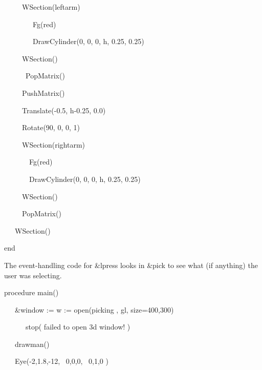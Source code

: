 \documentclass[letterpaper]{article}
\begin{document}
{{\sffamily
\ \ \ \ \  WSection({\textquotedbl}leftarm{\textquotedbl})}

{\sffamily
\ \ \ \ \  \ \ \ Fg({\textquotedbl}red{\textquotedbl})}

{\sffamily
\ \ \ \ \  \ \ \ DrawCylinder(0, 0, 0, h, 0.25, 0.25)}

{\sffamily
\ \ \ \ \  WSection()}

{\sffamily
\ \ \ \ \ \ PopMatrix()}

{\sffamily
\ \ \ \ \ PushMatrix()}

{\sffamily
\ \ \ \ \ Translate(-0.5, h-0.25, 0.0)}

{\sffamily
\ \ \ \ \ Rotate(90, 0, 0, 1)}

{\sffamily
\ \ \ \ \ WSection({\textquotedbl}rightarm{\textquotedbl})}

{\sffamily
\ \ \ \ \  \ \ Fg({\textquotedbl}red{\textquotedbl})}

{\sffamily
\ \ \ \ \  \ \ DrawCylinder(0, 0, 0, h, 0.25, 0.25)}

{\sffamily
\ \ \ \ \ WSection()}

{\sffamily
\ \ \ \ \ PopMatrix()}

{\sffamily
\ \ \ WSection()}

{\sffamily
end}


\bigskip

The event-handling code for \textsf{\&lpress} looks in \textsf{\&pick}
to see what (if anything) the user was selecting.

\bigskip

{\sffamily
procedure main()}

{\sffamily
\ \ \ \&window := w := open({\textquotedbl}picking{\textquotedbl} , {\textquotedbl}gl{\textquotedbl},
{\textquotedbl}size=400,300{\textquotedbl}) {\textbar}}

{\sffamily
\ \ \ \ \ \ stop({\textquotedbl} failed to open 3d window! {\textquotedbl})}

{\sffamily
\ \ \ drawman()}

{\sffamily
\ \ \ Eye(-2,1.8,-12, \ 0,0,0, \ 0,1,0 )}

}
\end{document}
